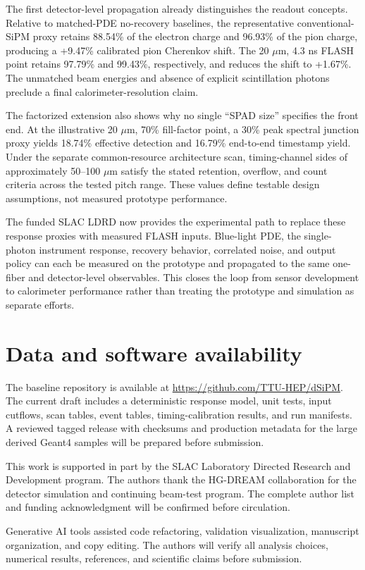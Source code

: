 \documentclass[a4paper,11pt]{article}
\begin{document}
The first detector-level propagation already distinguishes the readout
concepts. Relative to matched-PDE no-recovery baselines, the representative
conventional-SiPM proxy retains 88.54\% of the electron charge and 96.93\% of
the pion charge, producing a +9.47\% calibrated pion Cherenkov shift. The 20
$\mu$m, 4.3 ns FLASH point retains 97.79\% and 99.43\%, respectively, and
reduces the shift to +1.67\%. The unmatched beam energies and absence of
explicit scintillation photons preclude a final calorimeter-resolution claim.

The factorized extension also shows why no single ``SPAD size'' specifies the
front end. At the illustrative 20 $\mu$m, 70\% fill-factor point, a 30\% peak
spectral junction proxy yields 18.74\% effective detection and 16.79\%
end-to-end timestamp yield. Under the separate common-resource architecture
scan, timing-channel sides of approximately 50--100 $\mu$m satisfy the stated
retention, overflow, and count criteria across the tested pitch range. These
values define testable design assumptions, not measured prototype
performance.

The funded SLAC LDRD now provides the experimental path to replace these
response proxies with measured FLASH inputs. Blue-light PDE, the
single-photon instrument response, recovery behavior, correlated noise, and
output policy can each be measured on the prototype and propagated to the
same one-fiber and detector-level observables. This closes the loop from
sensor development to calorimeter performance rather than treating the
prototype and simulation as separate efforts.

\section{Data and software availability}

The baseline repository is available at
\url{https://github.com/TTU-HEP/dSiPM}. The current draft includes a
deterministic response model, unit tests, input cutflows, scan tables, event
tables, timing-calibration results, and run manifests. A reviewed tagged
release with checksums and production metadata for the large derived Geant4
samples will be prepared before submission.

\acknowledgments

This work is supported in part by the SLAC Laboratory Directed Research and
Development program. The authors thank the HG-DREAM collaboration for the
detector simulation and continuing beam-test program. The complete author list
and funding acknowledgment will be confirmed before circulation.

Generative AI tools assisted code refactoring, validation visualization,
manuscript organization, and copy editing. The authors will verify all
analysis choices, numerical results, references, and scientific claims before
submission.



\end{document}
